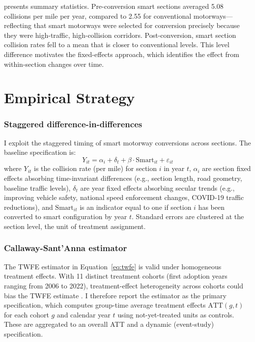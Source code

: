 \documentclass[12pt]{article}
\begin{document}


 presents summary statistics. Pre-conversion smart sections averaged 5.08 collisions per mile per year, compared to 2.55 for conventional motorways---reflecting that smart motorways were selected for conversion precisely because they were high-traffic, high-collision corridors. Post-conversion, smart section collision rates fell to a mean that is closer to conventional levels. This level difference motivates the fixed-effects approach, which identifies the effect from within-section changes over time.


\section{Empirical Strategy}

\subsubsection*{Staggered difference-in-differences} I exploit the staggered timing of smart motorway conversions across sections. The baseline specification is:
\begin{equation}
Y_{it} = \alpha_i + \delta_t + \beta \cdot \text{Smart}_{it} + \varepsilon_{it}
\label{eq:twfe}
\end{equation}
where $Y_{it}$ is the collision rate (per mile) for section $i$ in year $t$, $\alpha_i$ are section fixed effects absorbing time-invariant differences (e.g., section length, road geometry, baseline traffic levels), $\delta_t$ are year fixed effects absorbing secular trends (e.g., improving vehicle safety, national speed enforcement changes, COVID-19 traffic reductions), and $\text{Smart}_{it}$ is an indicator equal to one if section $i$ has been converted to smart configuration by year $t$. Standard errors are clustered at the section level, the unit of treatment assignment.

\subsubsection*{Callaway-Sant'Anna estimator} The TWFE estimator in Equation~\eqref{eq:twfe} is valid under homogeneous treatment effects. With 11 distinct treatment cohorts (first adoption years ranging from 2006 to 2022), treatment-effect heterogeneity across cohorts could bias the TWFE estimate \citep{goodman-bacon_2021}. I therefore report the \citet{callaway_2021} estimator as the primary specification, which computes group-time average treatment effects $\text{ATT}(g,t)$ for each cohort $g$ and calendar year $t$ using not-yet-treated units as controls. These are aggregated to an overall ATT and a dynamic (event-study) specification.
\end{document}
